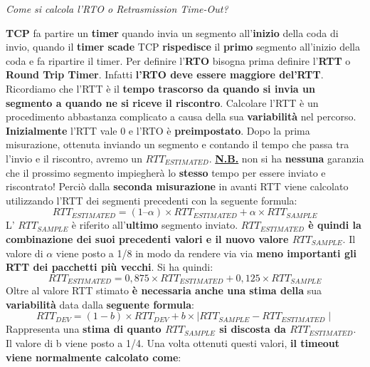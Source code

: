 \documentclass[11pt,a4paper]{article}
\theoremstyle{definition}
\begin{document}
\newpage
\begin{flushleft}
	\textit{Come si calcola l'RTO o Retrasmission Time-Out?}
\end{flushleft}
\textbf{TCP} fa partire un \textbf{timer} quando invia un segmento all'\textbf{inizio} della coda di invio, quando il \textbf{timer scade} TCP \textbf{rispedisce} il \textbf{primo} segmento all'inizio della coda e fa ripartire il timer. Per definire l'\textbf{RTO} bisogna prima definire l'\textbf{RTT} o \textbf{Round Trip Timer}. Infatti \textbf{l'RTO deve essere maggiore del'RTT}. Ricordiamo che l'RTT è il \textbf{tempo trascorso da quando si invia un segmento a quando ne si riceve il riscontro}. Calcolare l'RTT è un procedimento abbastanza complicato a causa della sua \textbf{variabilità} nel percorso.\newline
\textbf{Inizialmente} l'RTT vale 0 e l'RTO è \textbf{preimpostato}. Dopo la prima misurazione, ottenuta inviando un segmento e contando il tempo che passa tra l'invio e il riscontro, avremo un $RTT_{ESTIMATED}$. \newline\newline
\textbf{\underline{N.B.}} non si ha \textbf{nessuna} garanzia che il prossimo segmento impiegherà lo \textbf{stesso} tempo per essere inviato e riscontrato!\newline\newline
Perciò dalla \textbf{seconda misurazione} in avanti RTT viene calcolato utilizzando l'RTT dei segmenti precedenti con la seguente formula:
\begin{equation}
	RTT_{ESTIMATED} = (1 – \alpha) \times RTT_{ESTIMATED} + \alpha \times RTT_{SAMPLE}
\end{equation}
L' $RTT_{SAMPLE}$ è riferito all'\textbf{ultimo} segmento inviato.\textbf{ $RTT_{ESTIMATED}$ è quindi la combinazione dei suoi precedenti valori e il nuovo valore $RTT_{SAMPLE}$}. Il valore di $\alpha$ viene posto a 1/8 in modo da rendere via via \textbf{meno importanti gli RTT dei pacchetti più vecchi}. Si ha quindi:
\begin{equation}
	RTT_{ESTIMATED} = 0,875 \times RTT_{ESTIMATED} + 0,125 \times RTT_{SAMPLE}
\end{equation}
Oltre al valore RTT stimato \textbf{è necessaria anche una stima della} sua \textbf{variabilità} data dalla \textbf{seguente formula}:
\begin{equation}
	RTT_{DEV} = (1 - b) \times RTT_{DEV} + b \times \mid RTT_{SAMPLE} - RTT_{ESTIMATED} \mid
\end{equation}
Rappresenta una \textbf{stima di quanto $RTT_{SAMPLE}$ si discosta da $RTT_{ESTIMATED}$}. Il valore di b viene posto a 1/4. Una volta ottenuti questi valori, \textbf{il timeout viene normalmente calcolato come}:
\end{document}
